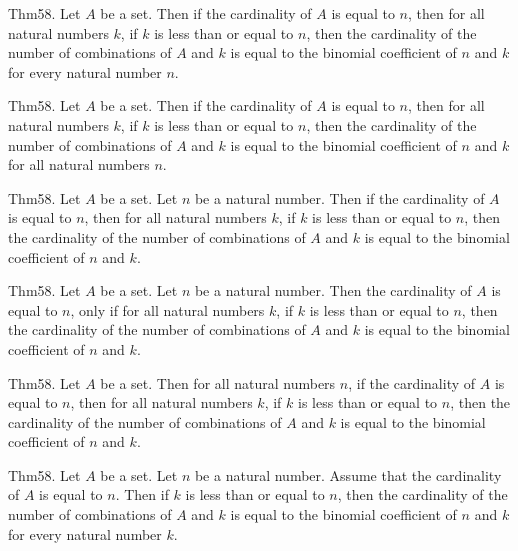 \documentclass{article}
\begin{document}
Thm58. Let $A$ be a set. Then if the cardinality of $A$ is equal to $n$, then for all natural numbers $k$, if $k$ is less than or equal to $n$, then the cardinality of the number of combinations of $A$ and $k$ is equal to the binomial coefficient of $n$ and $k$ for every natural number $n$.

Thm58. Let $A$ be a set. Then if the cardinality of $A$ is equal to $n$, then for all natural numbers $k$, if $k$ is less than or equal to $n$, then the cardinality of the number of combinations of $A$ and $k$ is equal to the binomial coefficient of $n$ and $k$ for all natural numbers $n$.

Thm58. Let $A$ be a set. Let $n$ be a natural number. Then if the cardinality of $A$ is equal to $n$, then for all natural numbers $k$, if $k$ is less than or equal to $n$, then the cardinality of the number of combinations of $A$ and $k$ is equal to the binomial coefficient of $n$ and $k$.

Thm58. Let $A$ be a set. Let $n$ be a natural number. Then the cardinality of $A$ is equal to $n$, only if for all natural numbers $k$, if $k$ is less than or equal to $n$, then the cardinality of the number of combinations of $A$ and $k$ is equal to the binomial coefficient of $n$ and $k$.

Thm58. Let $A$ be a set. Then for all natural numbers $n$, if the cardinality of $A$ is equal to $n$, then for all natural numbers $k$, if $k$ is less than or equal to $n$, then the cardinality of the number of combinations of $A$ and $k$ is equal to the binomial coefficient of $n$ and $k$.

Thm58. Let $A$ be a set. Let $n$ be a natural number. Assume that the cardinality of $A$ is equal to $n$. Then if $k$ is less than or equal to $n$, then the cardinality of the number of combinations of $A$ and $k$ is equal to the binomial coefficient of $n$ and $k$ for every natural number $k$.
\end{document}
